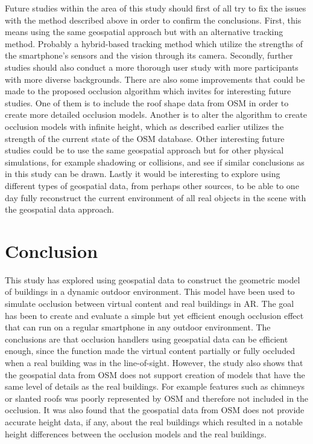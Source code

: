Future studies within the area of this study should first of all try  to fix the issues with the method described above in order to confirm the conclusions. First, this means using the same geospatial approach but with an alternative tracking method. Probably a hybrid-based tracking method which utilize the strengths of the smartphone's sensors and the vision through its camera. Secondly, further studies should also conduct a more thorough user study with more participants with more diverse backgrounds. There are also some improvements that could be made to the proposed occlusion algorithm which invites for interesting future studies. One of them is to include the roof shape data from OSM in order to create more detailed occlusion models. Another is to alter the algorithm to create occlusion models with infinite height, which as described earlier utilizes the strength of the current state of the OSM database. Other interesting future studies could be to use the same geospatial approach but for other physical simulations, for example shadowing or collisions, and see if similar conclusions as in this study can be drawn. Lastly it would be interesting to explore using different types of geospatial data, from perhaps other sources, to be able to one day fully reconstruct the current environment of all real objects in the scene with the geospatial data approach. 

\section{Conclusion}
This study has explored using geospatial data to construct the geometric model of buildings in a dynamic outdoor environment. This model have been used to simulate occlusion between virtual content and real buildings in AR. The goal has been to create and evaluate a simple but yet efficient enough occlusion effect that can run on a regular smartphone in any outdoor environment. The conclusions are that occlusion handlers using geospatial data can be efficient enough, since the function made the virtual content partially or fully occluded when a real building was in the line-of-sight. However, the study also shows that the geospatial data from OSM does not support creation of models that have the same level of details as the real buildings. For example features such as chimneys or slanted roofs was poorly represented by OSM and therefore not included in the occlusion. It was also found that the geospatial data from OSM does not provide accurate height data, if any, about the real buildings which resulted in a notable height differences between the occlusion models and the real buildings. 

